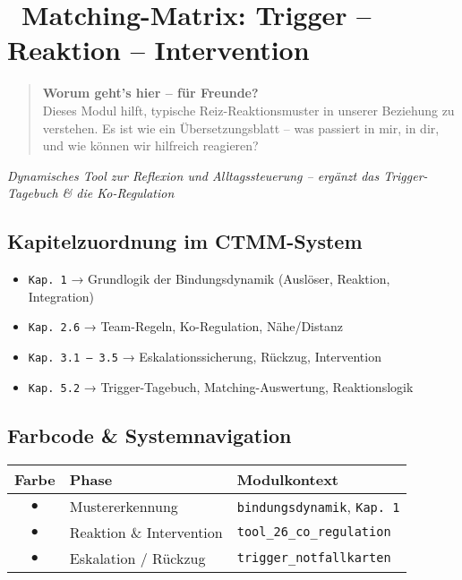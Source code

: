 
\section*{\textcolor{ctmmPurple}{\faPuzzlePiece~Matching-Matrix: Trigger -- Reaktion -- Intervention}}

\begin{quote}
\textbf{\textcolor{ctmmPurple}{Worum geht's hier -- für Freunde?}}\\
Dieses Modul hilft, typische Reiz-Reaktionsmuster in unserer Beziehung zu verstehen. Es ist wie ein Übersetzungsblatt -- was passiert in mir, in dir, und wie können wir hilfreich reagieren?
\end{quote}

\textit{Dynamisches Tool zur Reflexion und Alltagssteuerung -- ergänzt das Trigger-Tagebuch \& die Ko-Regulation}

\subsection*{\textcolor{ctmmPurple}{Kapitelzuordnung im CTMM-System}}

\begin{itemize}
  \item \texttt{Kap. 1} → Grundlogik der Bindungsdynamik (Auslöser, Reaktion, Integration)
  \item \texttt{Kap. 2.6} → Team-Regeln, Ko-Regulation, Nähe/Distanz
  \item \texttt{Kap. 3.1 – 3.5} → Eskalationssicherung, Rückzug, Intervention
  \item \texttt{Kap. 5.2} → Trigger-Tagebuch, Matching-Auswertung, Reaktionslogik
\end{itemize}

\subsection*{\textcolor{ctmmPurple}{Farbcode \& Systemnavigation}}

\begin{center}
\begin{tabular}{|c|l|l|}
\hline
\textbf{Farbe} & \textbf{Phase} & \textbf{Modulkontext} \\
\hline
\textcolor{ctmmBlue}{$\bullet$} & Mustererkennung & \texttt{bindungsdynamik}, \texttt{Kap. 1} \\
\textcolor{ctmmOrange}{$\bullet$} & Reaktion \& Intervention & \texttt{tool\_26\_co\_regulation} \\
\textcolor{ctmmRed}{$\bullet$} & Eskalation / Rückzug & \texttt{trigger\_notfallkarten} \\
\hline
\end{tabular}
\end{center}

